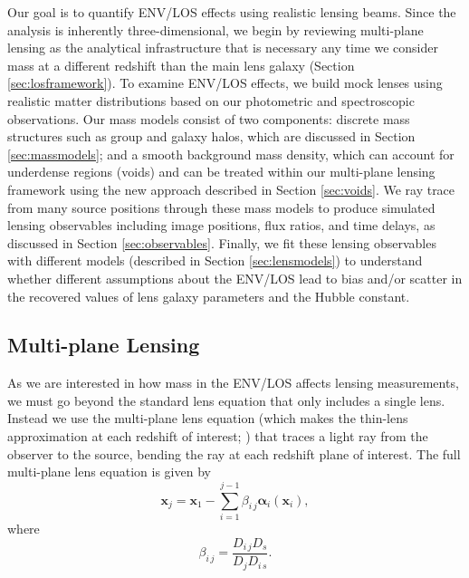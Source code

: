 \documentclass{emulateapj}
\newcommand\x[0]{\mathbf{x}}
\newcommand\al[0]{\boldsymbol{\alpha}}
\begin{document}
Our goal is to quantify ENV/LOS effects using realistic lensing beams. Since the analysis is inherently three-dimensional, we begin by reviewing multi-plane lensing as the analytical infrastructure that is necessary any time we consider mass at a different redshift than the main lens galaxy (Section \ref{sec:losframework}). To examine ENV/LOS effects, we build mock lenses using realistic matter distributions based on our photometric and spectroscopic observations. Our mass models consist of two components: discrete mass structures such as group and galaxy halos, which are discussed in Section \ref{sec:massmodels}; and a smooth background mass density, which can account for underdense regions (voids) and can be treated within our multi-plane lensing framework using the new approach described in Section \ref{sec:voids}. We ray trace from many source positions through these mass models to produce simulated lensing observables including image positions, flux ratios, and time delays, as discussed in Section \ref{sec:observables}. Finally, we fit these lensing observables with different models (described in Section \ref{sec:lensmodels}) to understand whether different assumptions about the ENV/LOS lead to bias and/or scatter in the recovered values of lens galaxy parameters and the Hubble constant.

\subsection{Multi-plane Lensing\label{sec:losframework}}
As we are interested in how mass in the ENV/LOS affects lensing measurements, we must go beyond the standard lens equation that only includes a single lens. Instead we use the multi-plane lens equation (which makes the thin-lens approximation at each redshift of interest; \citealt{PLW}) that traces a light ray from the observer to the source, bending the ray at each redshift plane of interest. The full multi-plane lens equation is given by
\begin{equation}
\x_{j} = \x_1 - \sum_{i=1}^{j - 1} \beta_{i\,j} \al_i(\x_i),
\label{eqn:full_mp}
\end{equation}
where 
\begin{equation}
\beta_{i\,j} = \frac{D_{i\,j} D_s}{D_{j}D_{i\,s}}.
\end{equation}
\end{document}
